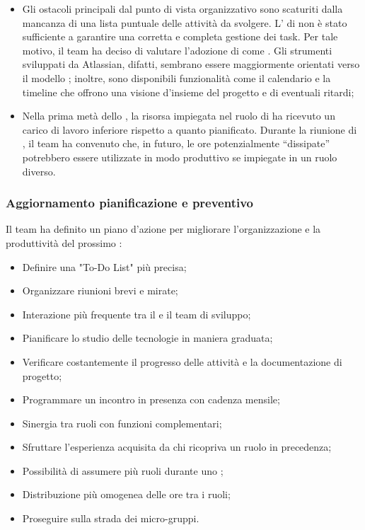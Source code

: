 \begin{itemize}
  \item Gli ostacoli principali dal punto di vista organizzativo sono scaturiti dalla mancanza di una lista puntuale delle attività da svolgere. L' di  non è stato sufficiente a garantire una corretta e completa gestione dei task. Per tale motivo, il team ha deciso di valutare l'adozione di  come . Gli strumenti sviluppati da Atlassian, difatti, sembrano essere maggiormente orientati verso il modello ; inoltre, sono disponibili funzionalità come il calendario e la timeline che offrono una visione d'insieme del progetto e di eventuali ritardi;
  \item Nella prima metà dello , la risorsa impiegata nel ruolo di \Verificatore{} ha ricevuto un carico di lavoro inferiore rispetto a quanto pianificato. Durante la riunione di , il team ha convenuto che, in futuro, le ore potenzialmente “dissipate” potrebbero essere utilizzate in modo produttivo se impiegate in un ruolo diverso.
\end{itemize}

\subsubsection{Aggiornamento pianificazione e preventivo}
\par Il team ha definito un piano d'azione per migliorare l'organizzazione e la produttività del prossimo :
\begin{itemize}
  \item Definire una "To-Do List" più precisa;
  \item Organizzare riunioni brevi e mirate;
  \item Interazione più frequente tra il \Responsabile{} e il team di sviluppo;
  \item Pianificare lo studio delle tecnologie in maniera graduata;
  \item Verificare costantemente il progresso delle attività e la documentazione di progetto;
  \item Programmare un incontro in presenza con cadenza mensile;
  \item Sinergia tra ruoli con funzioni complementari;
  \item Sfruttare l'esperienza acquisita da chi ricopriva un ruolo in precedenza;
  \item Possibilità di assumere più ruoli durante uno ;
  \item Distribuzione più omogenea delle ore tra i ruoli;
  \item Proseguire sulla strada dei micro-gruppi.
\end{itemize}

